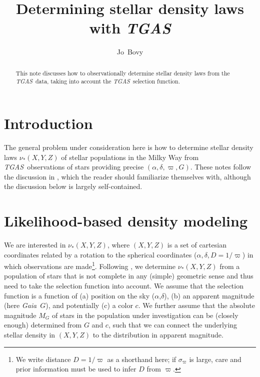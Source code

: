 \documentclass[12pt,preprint]{aastex}
\newcounter{address}
\newcommand{\dens}{\ensuremath{\nu_*}}
\newcommand{\gaia}{\emph{Gaia}}
\newcommand{\tgas}{\emph{TGAS}}
\newcommand{\ra}{\ensuremath{\alpha}}
\newcommand{\dec}{\ensuremath{\delta}}
\newcommand{\plx}{\ensuremath{\varpi}}
\begin{document}
\title{Determining stellar density laws with \tgas}
\author{Jo~Bovy}

\begin{abstract} 
  This note discusses how to observationally determine stellar density
  laws from the \tgas\ data, taking into account the \tgas\ selection
  function.
\end{abstract}

\section{Introduction}

The general problem under consideration here is how to determine
stellar density laws $\dens(X,Y,Z)$ of stellar populations in the
Milky Way from \tgas\ observations of stars providing precise
$(\ra,\dec,\plx,G)$. These notes follow the discussion in
\citet{Bovy16a}, which the reader should familiarize themselves with,
although the discussion below is largely self-contained.

\section{Likelihood-based density modeling}

We are interested in $\dens(X,Y,Z)$, where $(X,Y,Z)$ is a set of
cartesian coordinates related by a rotation to the spherical
coordinates ($\ra,\dec,D=1/\plx$) in which observations are
made\footnote{We write distance $D=1/\plx$ as a shorthand here; if
  $\sigma_\plx$ is large, care and prior information must be used to
  infer $D$ from $\plx$.}. Following \citet{Bovy16a}, we determine
$\dens(X,Y,Z)$ from a population of stars that is not complete in any
(simple) geometric sense and thus need to take the selection function
into account. We assume that the selection function is a function of
(a) position on the sky (\ra,\dec), (b) an apparent magnitude (here
\gaia\ $G$), and potentially (c) a color $c$. We further assume that
the absolute magnitude $M_G$ of stars in the population under
investigation can be (closely enough) determined from $G$ and $c$,
such that we can connect the underlying stellar density in $(X,Y,Z)$
to the distribution in apparent magnitude.
\end{document}
